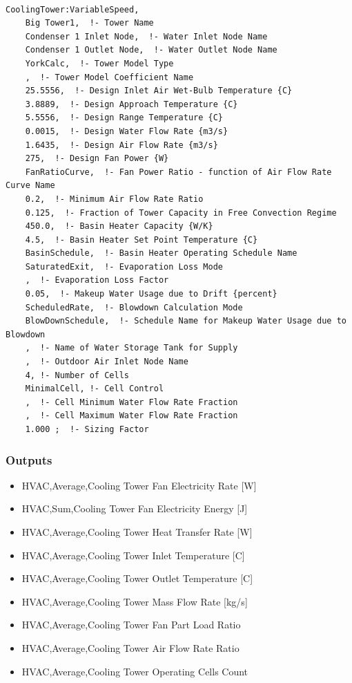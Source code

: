\begin{lstlisting}

CoolingTower:VariableSpeed,
    Big Tower1,  !- Tower Name
    Condenser 1 Inlet Node,  !- Water Inlet Node Name
    Condenser 1 Outlet Node,  !- Water Outlet Node Name
    YorkCalc,  !- Tower Model Type
    ,  !- Tower Model Coefficient Name
    25.5556,  !- Design Inlet Air Wet-Bulb Temperature {C}
    3.8889,  !- Design Approach Temperature {C}
    5.5556,  !- Design Range Temperature {C}
    0.0015,  !- Design Water Flow Rate {m3/s}
    1.6435,  !- Design Air Flow Rate {m3/s}
    275,  !- Design Fan Power {W}
    FanRatioCurve,  !- Fan Power Ratio - function of Air Flow Rate Curve Name
    0.2,  !- Minimum Air Flow Rate Ratio
    0.125,  !- Fraction of Tower Capacity in Free Convection Regime
    450.0,  !- Basin Heater Capacity {W/K}
    4.5,  !- Basin Heater Set Point Temperature {C}
    BasinSchedule,  !- Basin Heater Operating Schedule Name
    SaturatedExit,  !- Evaporation Loss Mode
    ,  !- Evaporation Loss Factor
    0.05,  !- Makeup Water Usage due to Drift {percent}
    ScheduledRate,  !- Blowdown Calculation Mode
    BlowDownSchedule,  !- Schedule Name for Makeup Water Usage due to Blowdown
    ,  !- Name of Water Storage Tank for Supply
    ,  !- Outdoor Air Inlet Node Name
    4, !- Number of Cells
    MinimalCell, !- Cell Control
    ,  !- Cell Minimum Water Flow Rate Fraction
    ,  !- Cell Maximum Water Flow Rate Fraction
    1.000 ;  !- Sizing Factor
\end{lstlisting}

\subsubsection{Outputs}\label{outputs-3-001}

\begin{itemize}
\item
  HVAC,Average,Cooling Tower Fan Electricity Rate {[}W{]}
\item
  HVAC,Sum,Cooling Tower Fan Electricity Energy {[}J{]}
\item
  HVAC,Average,Cooling Tower Heat Transfer Rate {[}W{]}
\item
  HVAC,Average,Cooling Tower Inlet Temperature {[}C{]}
\item
  HVAC,Average,Cooling Tower Outlet Temperature {[}C{]}
\item
  HVAC,Average,Cooling Tower Mass Flow Rate {[}kg/s{]}
\item
  HVAC,Average,Cooling Tower Fan Part Load Ratio
\item
  HVAC,Average,Cooling Tower Air Flow Rate Ratio
\item
  HVAC,Average,Cooling Tower Operating Cells Count
\end{itemize}

